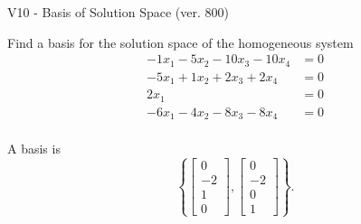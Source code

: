 \begin{exercise}
  \begin{exerciseTitle}V10 - Basis of Solution Space (ver. 800)\end{exerciseTitle}
  \begin{exerciseStatement}
    Find a basis for the solution space of the homogeneous system 
\begin{align*}
 -1 x_ 1 -5 x_ 2 -10 x_ 3 -10 x_ 4 &= 0  \\ 
  -5 x_ 1 + 1 x_ 2 + 2 x_ 3 + 2 x_ 4 &= 0  \\ 
  2 x_ 1 &= 0  \\ 
  -6 x_ 1 -4 x_ 2 -8 x_ 3 -8 x_ 4 &= 0  \\ 
 \end{align*}


 
  \end{exerciseStatement}

  \begin{exerciseAnswer}
   A basis is   
\[\left\{\left[\begin{array}{c}
0 \\
-2 \\
1 \\
0
\end{array}\right] , \left[\begin{array}{c}
0 \\
-2 \\
0 \\
1
\end{array}\right]\right\}.\]

  


  \end{exerciseAnswer}
\end{exercise}